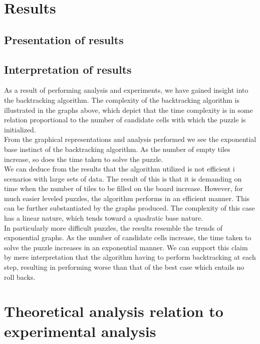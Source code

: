 \documentclass[12pt]{article}
\begin{document}
\section{Results}
\subsection{Presentation of results}
\subsection{Interpretation of results}
\begin{flushleft}
As a result of performing analysis and experiments, we have gained insight into the backtracking algorithm. The complexity of the backtracking algorithm is illustrated in the graphs above, which depict that the time complexity is in some relation proportional to the number of candidate cells with which the puzzle is initialized. 
\\
From the graphical representations and analysis performed we see the exponential base instinct of the backtracking algorithm. As the number of empty tiles increase, so does the time taken to solve the puzzle. \\

We can deduce from the results that the algorithm utilized is not efficient i scenarios with large sets of data. The result of this is that it is demanding on time when the number of tiles to be filled on the board increase. However, for much easier leveled puzzles, the algorithm performs in an efficient manner. This can be further substantiated by the graphs produced. The complexity of this case has a linear nature, which tends toward a quadratic base nature. \\

In particularly more difficult puzzles, the results resemble the trends of exponential graphs. As the number of candidate cells increase, the time taken to solve the puzzle increases in an exponential manner. We can support this claim by mere interpretation that the algorithm having to perform backtracking at each step, resulting in performing worse than that of the best case which entails no roll backs. 
\end{flushleft}
\section{Theoretical analysis relation to experimental analysis}
\end{document}

